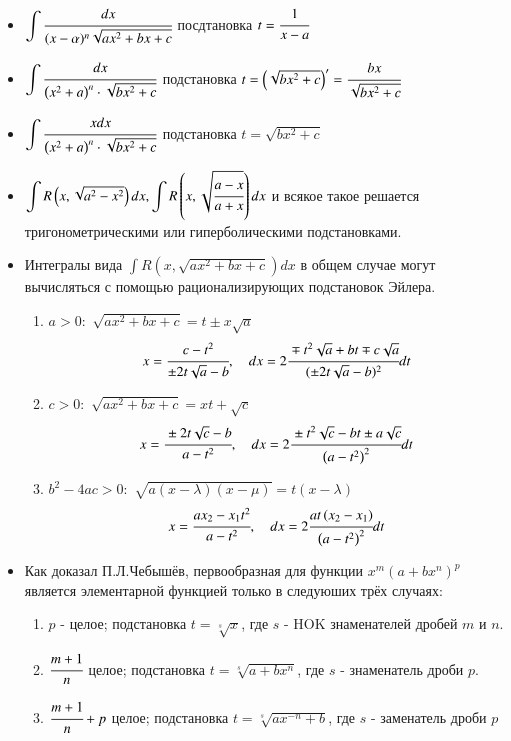 \documentclass[twoside, a4paperpt]{extarticle}
\begin{document}
\begin{itemize}
    \item $\displaystyle \int \cfrac{d x}{(x-\alpha)^{n} \sqrt{a x^{2}+b x+c}}$ посдтановка $t = \cfrac{1}{x-a}$
    
    \item $\displaystyle \int \cfrac{d x}{\left(x^{2}+a\right)^{n} \cdot \sqrt{b x^{2}+c}}$ подстановка $t=\left(\sqrt{b x^{2}+c}\right)^{\prime}=\cfrac{b x}{\sqrt{b x^{2}+c}}$

    \item $\displaystyle \int \cfrac{x d x}{\left(x^{2}+a\right)^{n} \cdot \sqrt{b x^{2}+c}}$ подстановка $t=\sqrt{b x^{2}+c}$
    
    \item $\displaystyle \int R\left(x, \sqrt{a^{2}-x^{2}}\right) d x, \displaystyle \int R\left(x, \sqrt{\cfrac{a-x}{a+x}}\right) d x$ и всякое такое решается тригонометрическими или гиперболическими подстановками.
    \newpage
    \item Интегралы вида $\displaystyle \int R\left(x, \sqrt{a x^{2}+b x+c}\right) d x$ в общем случае могут вычисляться с помощью рационализирующих подстановок Эйлера.
    \begin{enumerate}
        \item $a>0:$ $\sqrt{a x^{2}+b x+c}=t \pm x \sqrt{a}$
        $$
        x=\cfrac{c-t^{2}}{\pm 2 t \sqrt{a}-b}, \quad d x=2 \cfrac{\mp t^{2} \sqrt{a}+b t \mp c \sqrt{a}}{(\pm 2 t \sqrt{a}-b)^{2}} d t
        $$
        \item $c>0:$ $\sqrt{a x^{2}+b x+c}=x t+\sqrt{c}$
        $$
        x=\cfrac{\pm 2 t \sqrt{c}-b}{a-t^{2}}, \quad d x=2 \cfrac{\pm t^{2} \sqrt{c}-b t \pm a \sqrt{c}}{\left(a-t^{2}\right)^{2}} d t
        $$
        \item $b^{2}-4 a c>0:$ $\sqrt{a(x-\lambda)(x-\mu)}=t(x-\lambda)$
        $$
        x=\cfrac{a x_{2}-x_{1} t^{2}}{a-t^{2}},\quad d x=2 \cfrac{a t\left(x_{2}-x_{1}\right)}{\left(a-t^{2}\right)^{2}} d t
        $$
    \end{enumerate}

    \item Как доказал П.Л.Чебышёв, первообразная для функции $x^{m}\left(a+b x^{n}\right)^{p}$ является элементарной функцией только в следуюших трёх случаях:
    \begin{enumerate}
        \item $p$ - целое; подстановка $t=\sqrt[s]{x}$, где $s$ - HOK знаменателей дробей $m$ и $n$.
        \item $\cfrac{m+1}{n}$ целое; подстановка $t=\sqrt[s]{a+b x^{n}}$, где $s$ - знаменатель дроби $p$.
        \item $\cfrac{m+1}{n}+p$ целое; подстановка $t=\sqrt[s]{a x^{-n}+b}$, где $s$ - заменатель дроби $p$
    \end{enumerate}


\end{itemize}
\end{document}
